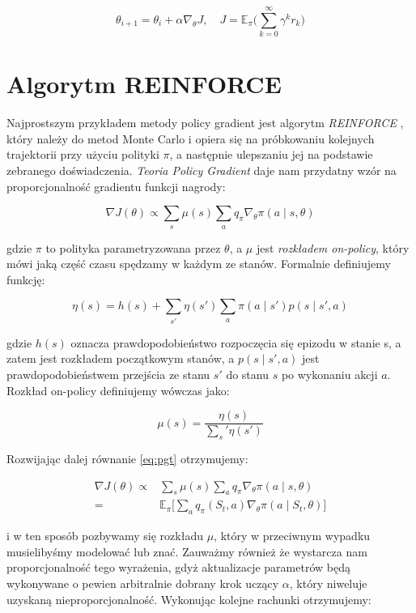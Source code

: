 \documentclass[licencjacka]{pracamgr}
\begin{document}
$$ \theta_{i+1} = \theta_i + \alpha \nabla_{\theta}J , \quad
J = \mathbb{E}_{\pi} \Big( \sum_{k = 0}^{\infty} \gamma^k r_k \Big)
$$

\section{Algorytm REINFORCE}

Najprostszym przykładem metody policy gradient jest algorytm \emph{REINFORCE} \cite{reinforce}, który należy do metod Monte Carlo i opiera się na próbkowaniu kolejnych trajektorii przy użyciu polityki $\pi$, a następnie ulepszaniu jej na podstawie zebranego doświadczenia. \emph{Teoria Policy Gradient} daje nam przydatny wzór na proporcjonalność gradientu funkcji nagrody:

\begin{equation}\label{eq:pgt}
\nabla J(\theta) \propto \sum_s \mu(s) \sum_a q_{\pi} \nabla_{\theta} \pi(a \mid s, \theta)
\end{equation}

gdzie $\pi$ to polityka parametryzowana przez $\theta$, a $\mu$ jest \emph{rozkładem on-policy}, który mówi jaką część czasu spędzamy w każdym ze stanów. Formalnie definiujemy funkcję:

$$ \eta(s) = h(s) + \sum_{s'} \eta(s') \sum_{a} \pi(a \mid s') p(s \mid s', a) $$

gdzie $ h(s) $ oznacza prawdopodobieństwo rozpoczęcia się epizodu w stanie s, a zatem jest rozkładem początkowym stanów, a $p(s \mid s', a) $ jest prawdopodobieństwem przejścia ze stanu $s'$ do stanu $s$ po wykonaniu akcji $a$. Rozkład on-policy definiujemy wówczas jako:

$$ \mu (s) = \frac{\eta(s)}{\sum_s' \eta(s')} $$

Rozwijając dalej równanie \eqref{eq:pgt} otrzymujemy:

\begin{align*}
\nabla J(\theta) \propto & \sum_s \mu(s) \sum_a q_{\pi} \nabla_{\theta} \pi(a \mid s, \theta) \\
= & \mathbb{E}_\pi \Bigg[ \sum_{a} q_\pi (S_t, a) \nabla_\theta \pi(a \mid S_t, \theta) \Bigg]
\end{align*}

i w ten sposób pozbywamy się rozkładu $\mu$, który w przeciwnym wypadku musielibyśmy modelować lub znać. Zauważmy również że wystarcza nam proporcjonalność tego wyrażenia, gdyż aktualizacje parametrów będą wykonywane o pewien arbitralnie dobrany krok uczący $\alpha$, który niweluje uzyskaną nieproporcjonalność. Wykonując kolejne rachunki otrzymujemy: 
\end{document}
